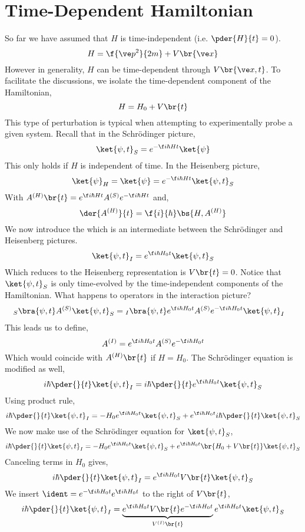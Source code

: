 \documentclass{article}
\begin{document}
\section{Time-Dependent Hamiltonian}
So far we have assumed that $H$ is time-independent (i.e. $\pder{H}{t} = 0$).
\[ H = \f{\ve p^2}{2m} + V\br{\ve x} \]
However in generality, $H$ can be time-dependent through $V\br{\ve x, t}$. To facilitate the discussions, we isolate the time-dependent component of the Hamiltonian,
\[ H = H_0 + V\br{t} \]
This type of perturbation is typical when attempting to experimentally probe a given system. Recall that in the Schrödinger picture,
\[ \ket{\psi, t}_S = e^{- \f i \hbar H t}\ket{\psi} \]
This only holds if $H$ is independent of time. In the Heisenberg picture,
\[ \ket{\psi}_H = \ket{\psi} = e^{- \f i \hbar H t} \ket{\psi, t}_S \]
With $A^{(H)}\br{t} = e^{\f i \hbar H t} A^{(S)} e^{-\f i \hbar H t}$ and,
\[ \der{A^{(H)}}{t} = \f{i}{\hbar} \bs{H, A^{(H)}} \]
We now introduce the  which is an intermediate between the Schrödinger and Heisenberg pictures.
\[ \ket{\psi, t}_I = e^{\f i \hbar H_0 t} \ket{\psi, t}_S \]
Which reduces to the Heisenberg representation is $V\br{t} = 0$. Notice that $\ket{\psi, t}_S$ is only time-evolved by the time-independent components of the Hamiltonian. What happens to operators in the interaction picture?
\begin{align*}
    _S\bra{\psi, t} A^{(S)} \ket{\psi, t}_S
    &= {}_I\bra{\psi, t} e^{\f i \hbar H_0 t}A^{(S)} e^{-\f i \hbar H_0 t} \ket{\psi, t}_I
\end{align*}
This leads us to define,
\[ A^{(I)} = e^{\f i \hbar H_0 t}A^{(S)} e^{-\f i \hbar H_0 t} \]
Which would coincide with $A^{(H)}\br{t}$ if $H = H_0$. The Schrödinger equation is modified as well,
\[ i \hbar \pder{}{t} \ket{\psi, t}_I = i \hbar \pder{}{t} e^{\f i \hbar H_0 t} \ket{\psi, t}_S \]
Using product rule,
\[ i \hbar \pder{}{t} \ket{\psi, t}_I = - H_0 e^{\f i \hbar H_0 t} \ket{\psi, t}_S + e^{\f i \hbar H_0 t} i \hbar \pder{}{t} \ket{\psi, t}_S \]
We now make use of the Schrödinger equation for $\ket{\psi, t}_S$,
\[ i \hbar \pder{}{t} \ket{\psi, t}_I = - H_0 e^{\f i \hbar H_0 t} \ket{\psi, t}_S + e^{\f i \hbar H_0 t} \br{H_0 + V\br{t}} \ket{\psi, t}_S \]
Canceling terms in $H_0$ gives,
\[ i \hbar \pder{}{t} \ket{\psi, t}_I = e^{\f i \hbar H_0 t} V\br{t} \ket{\psi, t}_S \]
We insert $\ident = e^{-\f i \hbar H_0 t} e^{\f i \hbar H_0 t}$ to the right of $V\br{t}$,
\[ i \hbar \pder{}{t} \ket{\psi, t}_I = \underbrace{e^{\f i \hbar H_0 t} V\br{t} e^{-\f i \hbar H_0 t}}_{V^{(I)}\br{t}} e^{\f i \hbar H_0 t} \ket{\psi, t}_S \]
\end{document}
